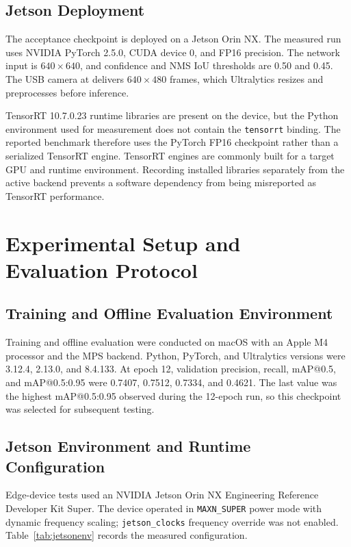 \documentclass[12pt,a4paper]{article}
\makeatletter
\newcommand{\mAPfifty}{mAP@0.5}
\newcommand{\mAPcoco}{mAP@0.5:0.95}
\makeatother
\begin{document}
\subsection{Jetson Deployment}

The acceptance checkpoint is deployed on a Jetson Orin NX. The measured run uses NVIDIA PyTorch 2.5.0, CUDA device 0, and FP16 precision. The network input is $640\times640$, and confidence and NMS IoU thresholds are 0.50 and 0.45. The USB camera at  delivers $640\times480$ frames, which Ultralytics resizes and preprocesses before inference.

TensorRT 10.7.0.23 runtime libraries are present on the device, but the Python environment used for measurement does not contain the \texttt{tensorrt} binding. The reported benchmark therefore uses the PyTorch FP16 checkpoint rather than a serialized TensorRT engine. TensorRT engines are commonly built for a target GPU and runtime environment\cite{nvidiatensorrt,nvidiatensorrtcompat}. Recording installed libraries separately from the active backend prevents a software dependency from being misreported as TensorRT performance.

\section{Experimental Setup and Evaluation Protocol}

\subsection{Training and Offline Evaluation Environment}

Training and offline evaluation were conducted on macOS with an Apple M4 processor and the MPS backend. Python, PyTorch, and Ultralytics versions were 3.12.4, 2.13.0, and 8.4.133. At epoch 12, validation precision, recall, \mAPfifty{}, and \mAPcoco{} were 0.7407, 0.7512, 0.7334, and 0.4621. The last value was the highest \mAPcoco{} observed during the 12-epoch run, so this checkpoint was selected for subsequent testing.

\subsection{Jetson Environment and Runtime Configuration}

Edge-device tests used an NVIDIA Jetson Orin NX Engineering Reference Developer Kit Super. The device operated in \texttt{MAXN\_SUPER} power mode with dynamic frequency scaling; \texttt{jetson\_clocks} frequency override was not enabled. Table~\ref{tab:jetsonenv} records the measured configuration.
\end{document}
